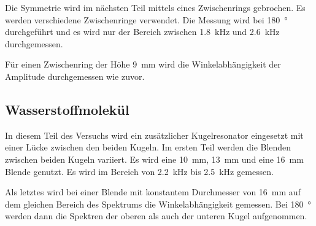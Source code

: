 Die Symmetrie wird im nächsten Teil mittels eines Zwischenrings gebrochen. Es werden verschiedene Zwischenringe verwendet. Die Messung wird bei \SI{180}{\degree} durchgeführt und es wird nur der Bereich zwischen \SI{1.8}{\kilo\hertz} und \SI{2.6}{\kilo\hertz} durchgemessen. 

Für einen Zwischenring der Höhe \SI{9}{\milli\metre} wird die Winkelabhängigkeit der Amplitude durchgemessen wie zuvor. 

\subsection{Wasserstoffmolekül}

In diesem Teil des Versuchs wird ein zusätzlicher Kugelresonator eingesetzt mit einer Lücke zwischen den beiden Kugeln. 
Im ersten Teil werden die Blenden zwischen beiden Kugeln variiert. Es wird eine \SI{10}{\milli\metre}, \SI{13}{\milli\metre} und eine \SI{16}{\milli\metre} Blende genutzt. Es wird im Bereich von \SI{2.2}{\kilo\hertz} bis \SI{2.5}{\kilo\hertz} gemessen. 

Als letztes wird bei einer Blende mit konstantem Durchmesser von \SI{16}{\milli\metre} auf dem gleichen Bereich des Spektrums die Winkelabhängigkeit gemessen. 
Bei \SI{180}{\degree} werden dann die Spektren der oberen als auch der unteren Kugel aufgenommen. 

